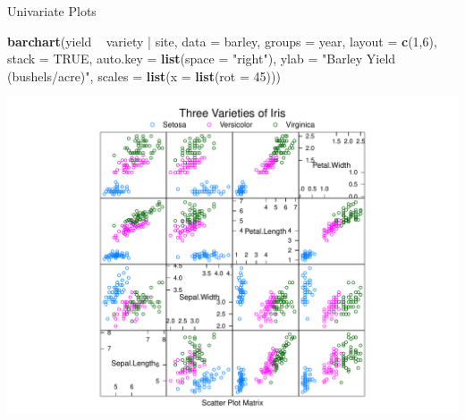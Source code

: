 \documentclass[ignorenonframetext,]{beamer}
\newenvironment{Shaded}{}{}
\newcommand{\KeywordTok}[1]{\textcolor[rgb]{0.00,0.44,0.13}{\textbf{{#1}}}}
\newcommand{\DataTypeTok}[1]{\textcolor[rgb]{0.56,0.13,0.00}{{#1}}}
\newcommand{\DecValTok}[1]{\textcolor[rgb]{0.25,0.63,0.44}{{#1}}}
\newcommand{\StringTok}[1]{\textcolor[rgb]{0.25,0.44,0.63}{{#1}}}
\newcommand{\OtherTok}[1]{\textcolor[rgb]{0.00,0.44,0.13}{{#1}}}
\newcommand{\NormalTok}[1]{{#1}}
\begin{document}
\begin{frame}[fragile]{Univariate Plots}

\begin{Shaded}
\begin{Highlighting}[]
\KeywordTok{barchart}\NormalTok{(yield ~}\StringTok{ }\NormalTok{variety |}\StringTok{ }\NormalTok{site, }\DataTypeTok{data =} \NormalTok{barley,}
         \DataTypeTok{groups =} \NormalTok{year, }\DataTypeTok{layout =} \KeywordTok{c}\NormalTok{(}\DecValTok{1}\NormalTok{,}\DecValTok{6}\NormalTok{), }\DataTypeTok{stack =} \OtherTok{TRUE}\NormalTok{,}
         \DataTypeTok{auto.key =} \KeywordTok{list}\NormalTok{(}\DataTypeTok{space =} \StringTok{"right"}\NormalTok{),}
         \DataTypeTok{ylab =} \StringTok{"Barley Yield (bushels/acre)"}\NormalTok{,}
         \DataTypeTok{scales =} \KeywordTok{list}\NormalTok{(}\DataTypeTok{x =} \KeywordTok{list}\NormalTok{(}\DataTypeTok{rot =} \DecValTok{45}\NormalTok{)))}
\end{Highlighting}
\end{Shaded}

\includegraphics{R_intern_files/figure-beamer/unnamed-chunk-230-1.pdf}

\end{frame}
\end{document}
